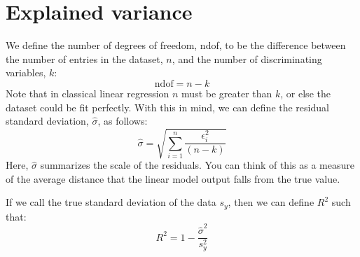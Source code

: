 \section{Explained variance}
\label{sec:explained_variance}

We define the number of degrees of freedom, ndof, to be the difference
between the number of entries in the dataset, $n$, and the number
of discriminating variables, $k$:
\begin{equation}
  \text{ndof} = n - k
\end{equation}
Note that in classical linear regression $n$ must be greater than $k$, or
else the dataset could be fit perfectly.
With this in mind, we can define the residual standard deviation, $\hat{\sigma}$, 
as follows:
\begin{equation}
  \hat{\sigma} = \sqrt{\sum_{i = 1}^{n}\frac{\epsilon_i^2}{\left(n - k\right)}}
\end{equation}
Here, $\hat{\sigma}$ summarizes the scale of the
residuals.  You can think of this as a measure of the average distance that
the linear model output falls from the true value.  

If we call the true standard deviation of the data $s_{y}$, then we can define $R^2$ such that:
\begin{equation}
R^2 = 1- \frac{\hat{\sigma}^2}{s_{y}^{2}}
\end{equation}


